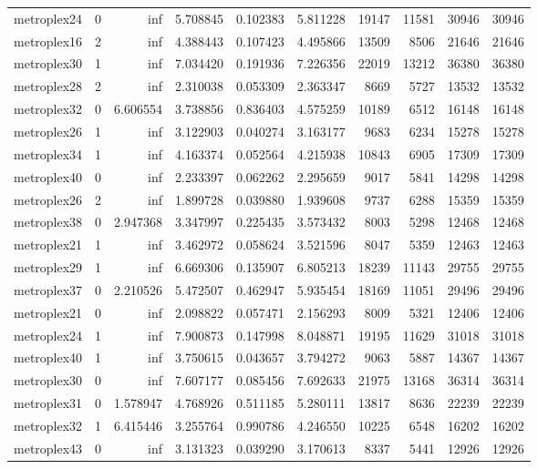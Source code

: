 \begin{longtable}{|l|r|r|r|r|r|r|r|r|r|}
metroplex24 & 0 & inf & 5.708845 & 0.102383 & 5.811228 & 19147 & 11581 & 30946 & 30946 \\
metroplex16 & 2 & inf & 4.388443 & 0.107423 & 4.495866 & 13509 & 8506 & 21646 & 21646 \\
metroplex30 & 1 & inf & 7.034420 & 0.191936 & 7.226356 & 22019 & 13212 & 36380 & 36380 \\
metroplex28 & 2 & inf & 2.310038 & 0.053309 & 2.363347 & 8669 & 5727 & 13532 & 13532 \\
metroplex32 & 0 & 6.606554 & 3.738856 & 0.836403 & 4.575259 & 10189 & 6512 & 16148 & 16148 \\
metroplex26 & 1 & inf & 3.122903 & 0.040274 & 3.163177 & 9683 & 6234 & 15278 & 15278 \\
metroplex34 & 1 & inf & 4.163374 & 0.052564 & 4.215938 & 10843 & 6905 & 17309 & 17309 \\
metroplex40 & 0 & inf & 2.233397 & 0.062262 & 2.295659 & 9017 & 5841 & 14298 & 14298 \\
metroplex26 & 2 & inf & 1.899728 & 0.039880 & 1.939608 & 9737 & 6288 & 15359 & 15359 \\
metroplex38 & 0 & 2.947368 & 3.347997 & 0.225435 & 3.573432 & 8003 & 5298 & 12468 & 12468 \\
metroplex21 & 1 & inf & 3.462972 & 0.058624 & 3.521596 & 8047 & 5359 & 12463 & 12463 \\
metroplex29 & 1 & inf & 6.669306 & 0.135907 & 6.805213 & 18239 & 11143 & 29755 & 29755 \\
metroplex37 & 0 & 2.210526 & 5.472507 & 0.462947 & 5.935454 & 18169 & 11051 & 29496 & 29496 \\
metroplex21 & 0 & inf & 2.098822 & 0.057471 & 2.156293 & 8009 & 5321 & 12406 & 12406 \\
metroplex24 & 1 & inf & 7.900873 & 0.147998 & 8.048871 & 19195 & 11629 & 31018 & 31018 \\
metroplex40 & 1 & inf & 3.750615 & 0.043657 & 3.794272 & 9063 & 5887 & 14367 & 14367 \\
metroplex30 & 0 & inf & 7.607177 & 0.085456 & 7.692633 & 21975 & 13168 & 36314 & 36314 \\
metroplex31 & 0 & 1.578947 & 4.768926 & 0.511185 & 5.280111 & 13817 & 8636 & 22239 & 22239 \\
metroplex32 & 1 & 6.415446 & 3.255764 & 0.990786 & 4.246550 & 10225 & 6548 & 16202 & 16202 \\
metroplex43 & 0 & inf & 3.131323 & 0.039290 & 3.170613 & 8337 & 5441 & 12926 & 12926 \\

\end{longtable}

